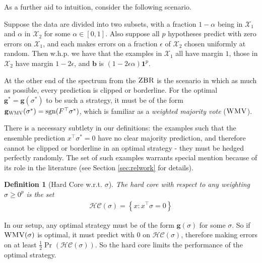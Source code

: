 \documentclass{colt2015} %
\newtheorem{defn}[thm]{Definition}
\newcommand{\vb}{\mathbf{b}}
\newcommand{\vg}{\mathbf{g}}
\newcommand{\vone}{\mathbf{1}}
\DeclareMathOperator{\sgn}{sgn}
\DeclareMathOperator{\Prtxt}{Pr}
\newcommand{\vnorm}[1]{\left\lVert#1\right\rVert} %
\newcommand{\prp}[2]{\Prtxt_{#2} \left(#1\right)}
\newcommand{\zbr}{\textsc{ZBR}}
\newcommand{\wmv}{\textsc{WMV}}
\newcommand{\hc}{\mathscr{HC}}
\newcommand{\sighat}{\hat{\sigma}}
\newcommand{\cX}{\mathcal{X}}
\newcommand{\lrsetb}[1]{\left\{#1\right\}}
\newcommand{\authcmt}[2]{\textcolor{#1}{}}
\newcommand{\akshay}[1]{\authcmt{red}{[AB: #1]}}
\begin{document}
As a further aid to intuition, 
consider the following scenario. 
\akshay{I'll rewrite this example.}
\begin{example}
\label{ex:combavgvote}
Suppose the data are divided into two subsets, 
with a fraction $1-\alpha$ being in $\cX_1$ and $\alpha$ in $\cX_2$ for some $\alpha \in [0,1]$. 
Also suppose all $p$ hypotheses predict with zero errors on $\cX_1$, 
and each makes errors on a fraction $\epsilon$ of $\cX_2$ chosen uniformly at random. 
Then w.h.p. we have that the examples in $\cX_1$ all have margin $1$, 
those in $\cX_2$ have margin $1 - 2 \epsilon$, 
and $\vb$ is $(1 - 2 \epsilon \alpha) \vone^p$.
\end{example}
\akshay{
In Example \ref{ex:combavgvote}, the ZBR consists of weightings $\sighat$ with $\vnorm{\sighat}_1 \leq 1$, 
since the examples in $\cX_1$ have margin $1$ under all distributions. 
However, the optimal strategy is $\sigma^* = \frac{1}{p (1 - 2 \epsilon)} \vone^p$, 
an unweighted majority vote with zero error: $V = -\gamma(\sigma^*) = 1$. 
Choosing $\vnorm{\sigma^*}_1 > 1$ forces the examples in $\cX_1$ to have margin $> 1$, 
but the hypotheses' errors are low enough to make this introduction of voting effects worthwhile.
}

At the other end of the spectrum from the $\zbr$ is the scenario 
in which as much as possible, every prediction is clipped or borderline. 
For the optimal $\vg^* = \vg (\sigma^*)$ to be such a strategy, 
it must be of the form $\vg_{\wmv} (\sigma^*) = \sgn(F^\top \sigma^*)$, 
which is familiar as a \emph{weighted majority vote} ($\wmv$). 

There is a necessary subtlety in our definitions: the examples such that 
the ensemble prediction $x^\top \sigma^* = 0$ have no clear majority prediction, 
and therefore cannot be clipped or borderline in an optimal strategy - 
they must be hedged perfectly randomly. 
The set of such examples warrants special mention because of its role in the literature 
(see Section \ref{sec:relwork} for details). 

\begin{defn}[Hard Core w.r.t. $\sigma$]
The \emph{hard core} with respect to any weighting $\sigma \geq 0^p$ is the set 
\begin{align*}
\hc (\sigma) = \lrsetb{ x : x^\top \sigma = 0 }
\end{align*}
\end{defn}
In our setup, any optimal strategy must be of the form $\vg (\sigma)$ for some $\sigma$. 
So if $\wmv(\sigma)$ is optimal, it must predict with $0$ on $\hc (\sigma)$, 
therefore making errors on at least $\frac{1}{2} \prp{\hc (\sigma)}{}$. 
So the hard core limits the performance of the optimal strategy. 
\end{document}
